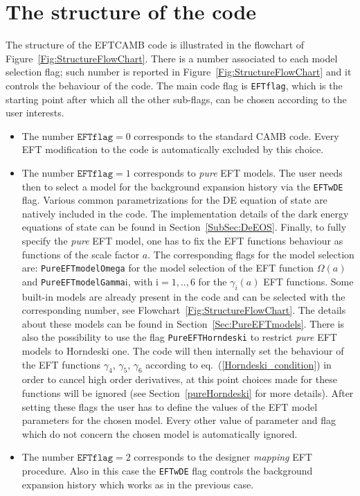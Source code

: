 \documentclass[prd,nofootinbib,showpacs]{revtex4}
\begin{document}
{\section{The structure of the code}\label{Sec:Code structure}
%
The structure of the EFTCAMB code is illustrated in the flowchart of Figure~\ref{Fig:StructureFlowChart}. There is a number associated to each model selection flag; such number is reported in Figure~\ref{Fig:StructureFlowChart} and it controls the behaviour of the code.
The main code flag is \texttt{EFTflag}, which is the starting point after which all the other sub-flags, can be chosen according to the user interests.
%
\begin{itemize}
\item The number $\texttt{EFTflag}=0$ corresponds to the standard CAMB code. Every EFT modification to the code is automatically excluded by this choice.
%
\item  The number $\texttt{EFTflag}=1$ corresponds to \textit{pure} EFT models. The user needs then to select a model for the background expansion history via the \texttt{EFTwDE} flag. Various common parametrizations for the DE equation of state are natively included in the code.
The implementation details of the dark energy equations of state can be found in Section~\ref{SubSec:DeEOS}.
Finally, to fully specify the {\it pure} EFT model, one has to fix the EFT functions behaviour as functions of the scale factor $a$. The corresponding flags for the model selection are: \texttt{PureEFTmodelOmega} for the model selection of the EFT function $\Omega(a)$ and \texttt{PureEFTmodelGamma}$\text{i}$, with $\text{i}=1,..,6$ for the $\gamma_i(a)$ EFT functions. Some built-in models are already present in the code and can be selected with the corresponding number, see Flowchart~\ref{Fig:StructureFlowChart}. The details about these models can be found in Section~\ref{Sec:PureEFTmodels}.
There is also the possibility to use the flag \texttt{PureEFTHorndeski} to restrict \textit{pure} EFT models to Horndeski one.  
The code will then internally set the behaviour of the EFT functions $\gamma_4$, $\gamma_5$, $\gamma_6$ according to eq.~(\ref{Horndeski_condition}) in order to cancel high order derivatives, at this point choices made for these functions will be ignored (see Section~\ref{pureHorndeski} for more details).
After setting these flags the user has to define the values of the EFT model parameters for the chosen model. Every other value of parameter and flag which do not concern the chosen model is automatically ignored.
%
\item The number $\texttt{EFTflag}=2$  corresponds to the designer \textit{mapping} EFT procedure. Also in this case the \texttt{EFTwDE} flag controls the background expansion history which works as in the previous case.\\

\end{itemize}}
\end{document}
